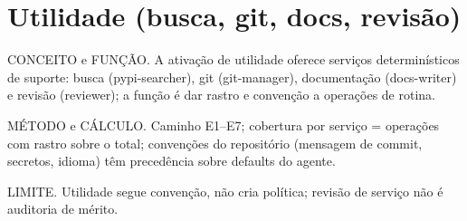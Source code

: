 \section{Utilidade (busca, git, docs, revisão)}
\begin{descricao}
CONCEITO e FUNÇÃO. A ativação de utilidade oferece serviços determinísticos de
suporte: busca (pypi-searcher), git (git-manager), documentação
(docs-writer) e revisão (reviewer); a função é dar rastro e convenção a
operações de rotina.
\end{descricao}
\begin{metodo}
MÉTODO e CÁLCULO. Caminho E1--E7; cobertura por serviço = operações com rastro
sobre o total; convenções do repositório (mensagem de commit, secretos,
idioma) têm precedência sobre defaults do agente.
\end{metodo}
\begin{aviso}
LIMITE. Utilidade segue convenção, não cria política; revisão de serviço não é
auditoria de mérito.
\end{aviso}
